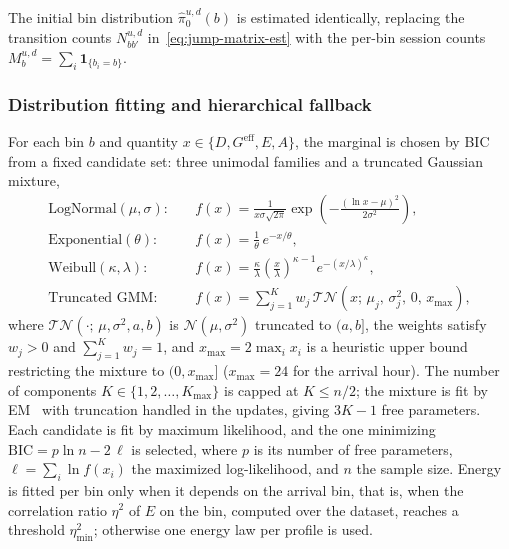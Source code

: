 \documentclass[journal]{IEEEtran}
\begin{document}
The initial bin distribution $\hat{\pi}_0^{u,d}(b)$ is estimated identically, replacing the transition counts $N_{bb'}^{u,d}$ in~\eqref{eq:jump-matrix-est} with the per-bin session counts $M_b^{u,d} = \sum_i \mathbf{1}_{\{b_i = b\}}$.


\subsubsection{Distribution fitting and hierarchical fallback}

For each bin $b$ and quantity $x \in \{D, G^{\mathrm{eff}}, E, A\}$, the marginal is chosen by BIC from a fixed candidate set: three unimodal families and a truncated Gaussian mixture,
\begin{align}
    \text{LogNormal}(\mu, \sigma)\!: \quad
    &f(x) = \frac{1}{x\sigma\sqrt{2\pi}}
    \exp\!\left(-\frac{(\ln x - \mu)^2}{2\sigma^2}\right),
    \nonumber \\
    \text{Exponential}(\theta)\!: \quad
    &f(x) = \frac{1}{\theta}\, e^{-x/\theta},
    \nonumber \\
    \text{Weibull}(\kappa, \lambda)\!: \quad
    &f(x) = \frac{\kappa}{\lambda}
    \left(\frac{x}{\lambda}\right)^{\kappa-1}
    e^{-(x/\lambda)^\kappa},
    \nonumber \\
    \text{Truncated GMM}\!: \quad
    &f(x) = \sum_{j=1}^{K} w_j\,
    \mathcal{TN}(x;\, \mu_j,\, \sigma_j^2,\, 0,\, x_{\max}),
    \label{eq:candidate-families}
\end{align}
where $\mathcal{TN}(\cdot;\, \mu, \sigma^2, a, b)$ is $\mathcal{N}(\mu, \sigma^2)$ truncated to $(a, b]$, the weights satisfy $w_j > 0$ and $\sum_{j=1}^{K} w_j = 1$, and $x_{\max} = 2\max_i x_i$ is a heuristic upper bound restricting the mixture to $(0, x_{\max}]$ ($x_{\max} = 24$ for the arrival hour). The number of components $K \in \{1, 2, \ldots, K_{\max}\}$ is capped at $K \le n/2$; the mixture is fit by EM~\cite{lee2012algorithms} with truncation handled in the updates, giving $3K - 1$ free parameters. Each candidate is fit by maximum likelihood, and the one minimizing $\mathrm{BIC} = p \ln n - 2\,\ell$ is selected, where $p$ is its number of free parameters, $\ell = \sum_i \ln f(x_i)$ the maximized log-likelihood, and $n$ the sample size. Energy is fitted per bin only when it depends on the arrival bin, that is, when the correlation ratio $\eta^2$ of $E$ on the bin, computed over the dataset, reaches a threshold $\eta^2_{\min}$; otherwise one energy law per profile is used.
\end{document}
